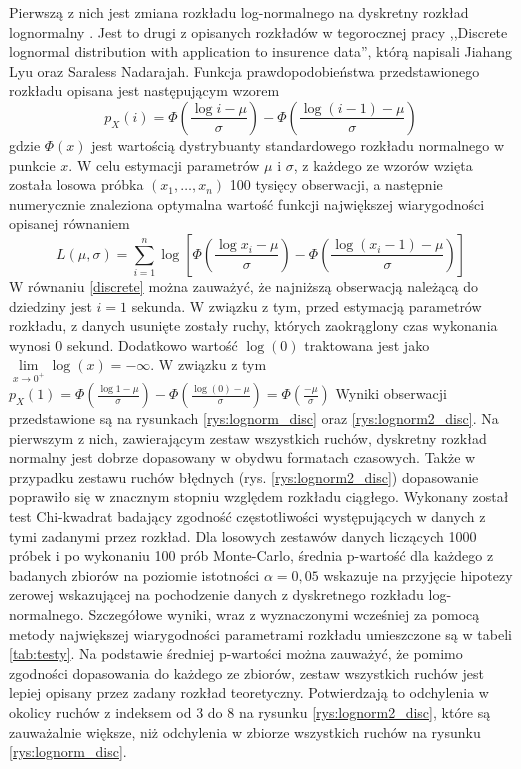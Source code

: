 \documentclass[inzynierska]{pwr_wmat_praca_dyplomowa}
\theoremstyle{plain}
\numberwithin{theorem}{chapter}
\theoremstyle{definition}
\numberwithin{theorem}{chapter}
\begin{document}
Pierwszą z nich jest zmiana rozkładu log-normalnego na dyskretny rozkład lognormalny \cite{lognorm_disc}. Jest to drugi z opisanych rozkładów w tegorocznej pracy ,,Discrete lognormal distribution with application to insurence data'', którą napisali Jiahang Lyu oraz Saraless Nadarajah. Funkcja prawdopodobieństwa przedstawionego rozkładu opisana jest następującym wzorem
\begin{equation}\label{discrete}
	p_{X}(i)= \Phi\left(\frac{\log i - \mu}{\sigma} \right) - \Phi\left(\frac{\log \left(i - 1\right) - \mu}{\sigma} \right)
\end{equation}
gdzie $\Phi(x)$ jest wartością dystrybuanty standardowego rozkładu normalnego w punkcie $x$.
W celu estymacji parametrów $\mu$ i $\sigma$, z każdego ze wzorów wzięta została losowa próbka $(x_1, \dots, x_n)$ 100 tysięcy obserwacji, a następnie numerycznie znaleziona optymalna wartość funkcji największej wiarygodności opisanej równaniem
\begin{equation}
	L(\mu,\sigma) = \sum_{i=1}^{n} \log\left[ \Phi\left(\frac{\log x_i - \mu}{\sigma} \right) - \Phi\left(\frac{\log \left(x_i - 1\right) - \mu}{\sigma} \right)\right]
\end{equation}
W równaniu \ref{discrete} można zauważyć, że najniższą obserwacją należącą do dziedziny jest $i = 1$ sekunda. W związku z tym, przed estymacją parametrów rozkładu, z danych usunięte zostały ruchy, których zaokrąglony czas wykonania wynosi 0 sekund. Dodatkowo wartość $\log(0)$ traktowana jest jako $\lim\limits_{x \rightarrow 0^{+}}\log(x) = -\infty$. W związku z tym~$p_{X}(1)= \Phi\left(\frac{\log 1 - \mu}{\sigma} \right) - \Phi\left(\frac{\log \left(0\right) - \mu}{\sigma} \right) = \Phi\left(\frac{- \mu}{\sigma} \right)$
 Wyniki obserwacji przedstawione są na rysunkach \ref{rys:lognorm_disc} oraz \ref{rys:lognorm2_disc}. Na pierwszym z nich, zawierającym zestaw wszystkich ruchów, dyskretny rozkład normalny jest dobrze dopasowany w obydwu formatach czasowych. Także w przypadku zestawu ruchów błędnych (rys. \ref{rys:lognorm2_disc}) dopasowanie poprawiło się w znacznym stopniu względem rozkładu ciągłego. Wykonany został test Chi-kwadrat badający zgodność częstotliwości występujących w danych z tymi zadanymi przez rozkład. Dla losowych zestawów danych liczących 1000 próbek i po wykonaniu 100 prób Monte-Carlo, średnia p-wartość dla każdego z badanych zbiorów na poziomie istotności $\alpha = 0,05$ wskazuje na przyjęcie hipotezy zerowej  wskazującej na pochodzenie danych z dyskretnego rozkładu log-normalnego. Szczegółowe wyniki, wraz z wyznaczonymi wcześniej za pomocą metody największej wiarygodności parametrami rozkładu umieszczone są w tabeli \ref{tab:testy}. Na podstawie średniej p-wartości można zauważyć, że pomimo zgodności dopasowania do każdego ze zbiorów, zestaw wszystkich ruchów jest lepiej opisany przez zadany rozkład teoretyczny. Potwierdzają to odchylenia w okolicy ruchów z indeksem od 3 do 8 na rysunku \ref{rys:lognorm2_disc}, które są zauważalnie większe, niż odchylenia w zbiorze wszystkich ruchów na rysunku \ref{rys:lognorm_disc}.
\end{document}
